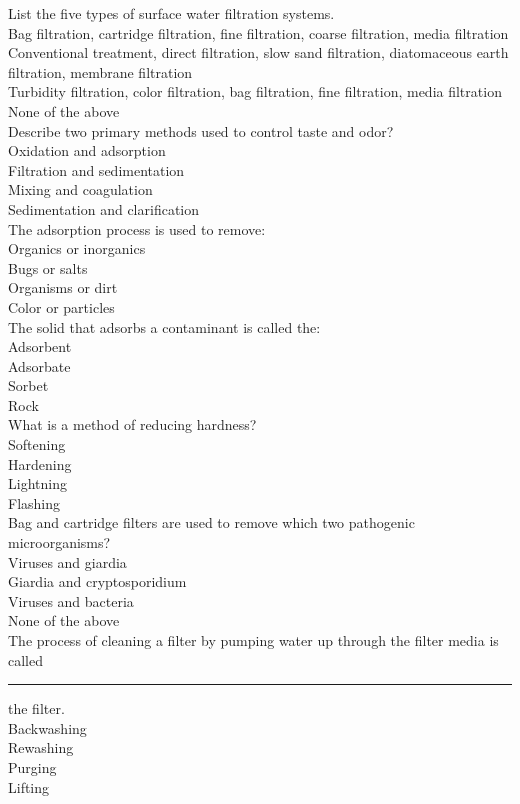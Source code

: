 List the five types of surface water filtration systems.\\
Bag filtration, cartridge filtration, fine filtration, coarse filtration, media filtration\\
Conventional treatment, direct filtration, slow sand filtration, diatomaceous earth filtration, membrane filtration\\
Turbidity filtration, color filtration, bag filtration, fine filtration, media filtration\\
None of the above\\
Describe two primary methods used to control taste and odor?\\
Oxidation and adsorption\\
Filtration and sedimentation\\
Mixing and coagulation\\
Sedimentation and clarification\\
The adsorption process is used to remove:\\
Organics or inorganics\\
Bugs or salts\\
Organisms or dirt\\
Color or particles\\
The solid that adsorbs a contaminant is called the:\\
Adsorbent\\
Adsorbate\\
Sorbet\\
Rock\\
What is a method of reducing hardness?\\
Softening\\
Hardening\\
Lightning\\
Flashing\\
Bag and cartridge filters are used to remove which two pathogenic microorganisms?\\
Viruses and giardia\\
Giardia and cryptosporidium\\
Viruses and bacteria\\
None of the above\\
The process of cleaning a filter by pumping water up through the filter media is called \rule{2cm}{0.3pt} the filter.\\
Backwashing\\
Rewashing\\
Purging\\
Lifting\\
